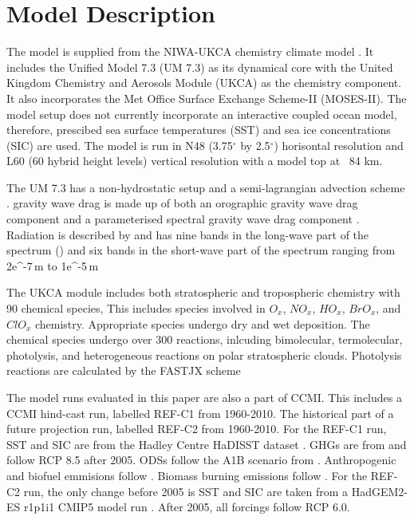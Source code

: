 \section{Model Description}

The model is supplied from the NIWA-UKCA chemistry climate model \citep{Morgenstern:2009bu}. It includes the Unified Model 7.3 (UM 7.3) as its dynamical core with the United Kingdom Chemistry and Aerosols Module (UKCA) as the chemistry component. It also incorporates the Met Office Surface Exchange Scheme-II (MOSES-II). The model setup does not currently incorporate an interactive coupled ocean model, therefore, prescibed sea surface temperatures (SST) and sea ice concentrations (SIC) are used. The model is run in N48 (3.75$^\circ$ by 2.5$^\circ$) horisontal resolution and L60 (60 hybrid height levels) vertical resolution with a model top at ~84 km.

The UM 7.3 has a non-hydrostatic setup \citep{Davies:2005vu} and a semi-lagrangian advection scheme \citep{Priestley:1993ur}. gravity wave drag is made up of both an orographic gravity wave drag component \citep{Webster:2003vf} and a parameterised spectral gravity wave drag component \citep{Scaife:2002vt}. Radiation is described by \cite{Edwards:1996wo} and has nine bands in the long-wave part of the spectrum () and six bands in the short-wave part of the spectrum ranging from 2e^{-7}\,m to 1e^{-5}\,m

The UKCA module includes both stratospheric and tropospheric chemistry with 90 chemical species, This includes species involved in $O_x$, $NO_x$, $HO_x$, $BrO_x$, and $ClO_x$ chemistry. Appropriate species undergo dry and wet deposition. The chemical species undergo over 300 reactions, inlcuding bimolecular, termolecular, photolysis, and heterogeneous reactions on polar stratospheric clouds. Photolysis reactions are calculated by the FASTJX scheme \citep{Neu:2007wi}

The model runs evaluated in this paper are also a part of CCMI. This includes a CCMI hind-cast run, labelled REF-C1 from 1960-2010. The historical part of a future projection run, labelled REF-C2 from 1960-2010. For the REF-C1 run, SST and SIC are from the Hadley Centre HaDISST dataset \citep{Rayner:2003ty}. GHGs are from \citep{Meinshausen:2011is} \citep{Riahi:2011dk} and follow RCP 8.5 after 2005. ODSs follow the A1B scenario from \citep{WMO:2011vf}. Anthropogenic and biofuel emmisions follow \citep{Granier:2011dw}. Biomass burning emissions follow \citep{Lamarque:2011wr} \citep{vanderWerf:2006gi} \citep{Schultz:2008wf}. For the REF-C2 run, the only change before 2005 is SST and SIC are taken from a HadGEM2-ES r1p1i1 CMIP5 model run \cite{Jones:2011ii}. After 2005, all forcings follow RCP 6.0. 